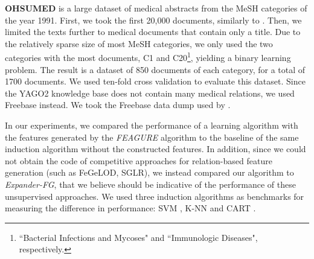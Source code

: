 \documentclass[twoside,11pt]{article}
\theoremstyle{definition}
\begin{document}

\textbf{OHSUMED}  is a large dataset of medical abstracts from the MeSH categories of the year 1991. 
First, we took the first 20,000 documents, similarly to .
Then, we limited the texts further to medical documents that contain only a title. %
Due to the relatively sparse size of most MeSH categories, we only used the two categories with the most documents, C1 and C20\footnote{``Bacterial Infections and Mycoses" and ``Immunologic Diseases", respectively.}, yielding a binary learning problem.
The result is a dataset of 850 documents of each category, for a total of 1700 documents.
We used ten-fold cross validation to evaluate this dataset.
Since the YAGO2 knowledge base does not contain many medical relations, we used Freebase instead. We took the Freebase data dump used by . 

In our experiments, we compared the performance of a learning algorithm with the features generated by the \emph{FEAGURE} algorithm to the baseline of the same induction algorithm without the constructed features. In addition, since we could not obtain the code of competitive approaches for relation-based feature generation (such as FeGeLOD, SGLR), we instead compared our algorithm to \emph{Expander-FG}, that we believe should be indicative of the performance of these unsupervised approaches.
We used three induction algorithms as benchmarks for measuring the difference in performance: SVM \cite{cortes1995support}, K-NN \cite{fix1951discriminatory} and CART \cite{breiman1984classification}.


 
\end{document}
